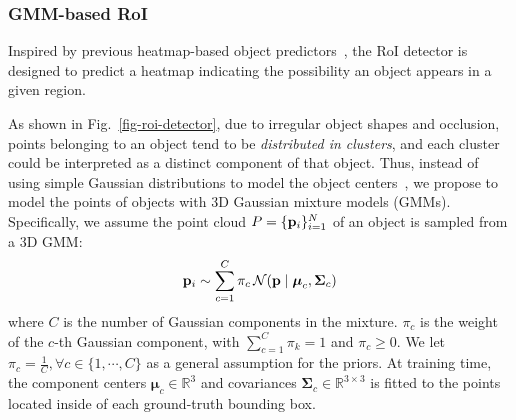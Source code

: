 

\subsubsection{GMM-based RoI}
Inspired by previous heatmap-based object predictors~\cite{yin2021center,zhao2023ada3d,law2018cornernet,zhou2019objects}, the RoI detector is designed to predict a heatmap indicating the possibility an object appears in a given region. 

As shown in Fig.~\ref{fig-roi-detector}, due to irregular object shapes and occlusion, points belonging to an object tend to be \textit{distributed in clusters}, and each cluster could be interpreted as a distinct component of that object. Thus, instead of using simple Gaussian distributions to model the object centers~\cite{yin2021center, zhou2019objects}, we propose to model the points of objects with 3D Gaussian mixture models (GMMs). Specifically, we assume the point cloud ${P} = \{\mathbf{p}_i\}_{i=1}^N$ of an object is sampled from a 3D GMM:
\begin{equation}
\mathbf{p}_i \sim \sum_{c=1}^{C} \pi_c \, \mathcal{N}(\mathbf{p} \mid \boldsymbol{\mu}_c, \boldsymbol{\Sigma}_c)
\end{equation}
where $C$ is the number of Gaussian components in the mixture. $\pi_c$ is the weight of the $c$-th Gaussian component, with $\sum_{c=1}^C \pi_k = 1$ and $\pi_c \geq 0$. We let $\pi_c=\frac{1}{C},\forall c\in\{1,\cdots,C\}$ as a general assumption for the priors. At training time, the component centers $\boldsymbol{\mu}_c \in \mathbb{R}^3$ and covariances $\boldsymbol{\Sigma}_c \in \mathbb{R}^{3 \times 3}$ is fitted to the points located inside of each ground-truth bounding box. 

